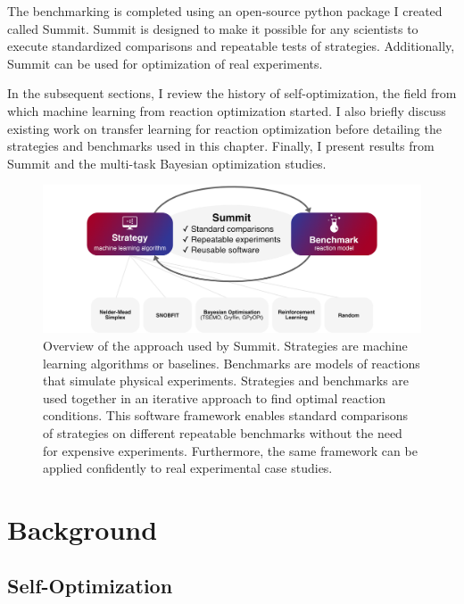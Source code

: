 The benchmarking is completed using an open-source python package I created called Summit. Summit is designed to make it possible for any scientists to execute standardized comparisons and repeatable tests of strategies. Additionally, Summit can be used for optimization of real experiments.


In the subsequent sections, I review the history of self-optimization, the field from which machine learning from reaction optimization started. I also briefly discuss existing work on transfer learning for reaction optimization before detailing the strategies and benchmarks used in this chapter. Finally, I present results from Summit and the multi-task Bayesian optimization studies.

\begin{figure}
    \centering
    \includegraphics[width=\textwidth]{gfx/Chapter02/overview.png}
    \caption{Overview of the approach used by Summit. Strategies are machine learning algorithms or baselines. Benchmarks are models of reactions that simulate physical experiments. Strategies and benchmarks are used together in an iterative approach to find optimal reaction conditions. This software framework enables standard comparisons of strategies on different repeatable benchmarks without the need for expensive experiments. Furthermore, the same framework can be applied confidently to real experimental case studies.}
    \label{fig:overview}
\end{figure}

\section{Background}

\subsection{Self-Optimization}

